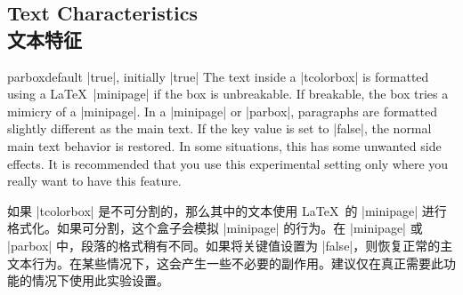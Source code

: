 \setcounter{section}{4}
\setcounter{subsection}{17}
\setcounter{subsubsection}{0}
\subsection{Text Characteristics\\文本特征}

\begin{docTcbKey}[][doc updated=2015-10-14]{parbox}{}{default |true|, initially |true|}
The text inside a |tcolorbox| is formatted using a \LaTeX\ |minipage|
if the box is unbreakable. 
If breakable, the box tries a mimicry of a |minipage|. 
In a |minipage| or |parbox|, paragraphs are formatted slightly different
as the main text. If the key value is set to |false|, the normal main text
behavior is restored. In some situations, this has some unwanted side
effects. It is recommended that you use this experimental setting only
where you really want to have this feature.

如果 |tcolorbox| 是不可分割的，那么其中的文本使用 \LaTeX\ 的 |minipage| 进行格式化。如果可分割，这个盒子会模拟 |minipage| 的行为。在 |minipage| 或 |parbox| 中，段落的格式稍有不同。如果将关键值设置为 |false|，则恢复正常的主文本行为。在某些情况下，这会产生一些不必要的副作用。建议仅在真正需要此功能的情况下使用此实验设置。

\end{docTcbKey}

\begin{dispListing}

\begin{tcolorbox}[parbox,adjusted title={parbox=true (normal)}]
\lipsum[1-2]
\end{tcolorbox}\hfill%
\begin{tcolorbox}[parbox=false,adjusted title={parbox=false}]
\lipsum[1-2]
\end{tcolorbox}%
\end{dispListing}
{\tcbusetemp}




